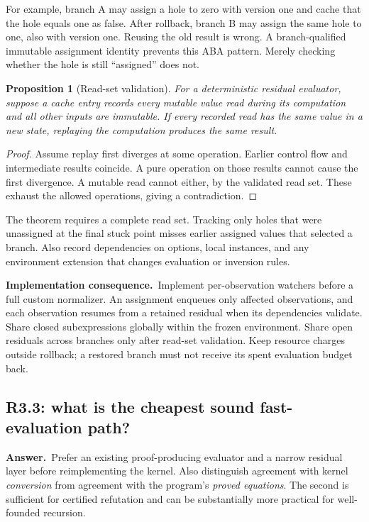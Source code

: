 \documentclass[11pt,a4paper]{article}
\newtheorem{proposition}{Proposition}[section]
\theoremstyle{definition}
\theoremstyle{remark}
\newcommand{\ans}{\noindent\textbf{Answer.}\ }
\newcommand{\imp}{\par\noindent\textbf{Implementation consequence.}\ }
\begin{document}
For example, branch A may assign a hole to zero with version one and cache
that the hole equals one as false. After rollback, branch B may assign the
same hole to one, also with version one. Reusing the old result is wrong. A
branch-qualified immutable assignment identity prevents this ABA pattern.
Merely checking whether the hole is still ``assigned'' does not.

\begin{proposition}[Read-set validation]\label{prop:cache}
For a deterministic residual evaluator, suppose a cache entry records every
mutable value read during its computation and all other inputs are immutable.
If every recorded read has the same value in a new state, replaying the
computation produces the same result.
\end{proposition}
\begin{proof}
Assume replay first diverges at some operation. Earlier control flow and
intermediate results coincide. A pure operation on those results cannot cause
the first divergence. A mutable read cannot either, by the validated read set.
These exhaust the allowed operations, giving a contradiction.
\end{proof}

The theorem requires a complete read set. Tracking only holes that were
unassigned at the final stuck point misses earlier assigned values that
selected a branch. Also record dependencies on options, local instances,
and any environment extension that changes evaluation or inversion rules.

\imp Implement per-observation watchers before a full custom normalizer. An
assignment enqueues only affected observations, and each observation resumes
from a retained residual when its dependencies validate. Share closed
subexpressions globally within the frozen environment. Share open residuals
across branches only after read-set validation. Keep resource charges outside
rollback; a restored branch must not receive its spent evaluation budget back.

\subsection{R3.3: what is the cheapest sound fast-evaluation path?}\label{q:R3.3}
\ans Prefer an existing proof-producing evaluator and a narrow residual layer
before reimplementing the kernel. Also distinguish agreement with kernel
\emph{conversion} from agreement with the program's \emph{proved equations}.
The second is sufficient for certified refutation and can be substantially
more practical for well-founded recursion.
\end{document}
